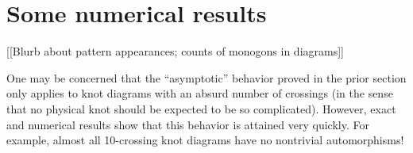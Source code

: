\documentclass[amsmath,longbibliography,secnumarabic,floatfix,amssymb,nofootinbib,nobibnotes,letterpaper,11pt,tightenlines,notitlepage,showkeys,showlabels]{amsart}%
\begin{document}
\section{Some numerical results}
\label{sec:randres}

[[Blurb about pattern appearances; counts of monogons in diagrams]]

One may be concerned that the ``asymptotic'' behavior proved in the prior section only applies to
knot diagrams with an absurd number of crossings (in the sense that no physical knot should be
expected to be so complicated). However, exact and numerical results show that this behavior is
attained very quickly. For example, almost all 10-crossing knot diagrams have no nontrivial
automorphisms!

\printbibliography
\end{document}
